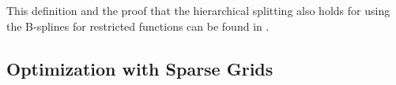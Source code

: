 This definition and the proof that the hierarchical splitting also holds for using the B-splines for restricted functions can be found in \cite{b_splines}.

\subsection{Optimization with Sparse Grids}



